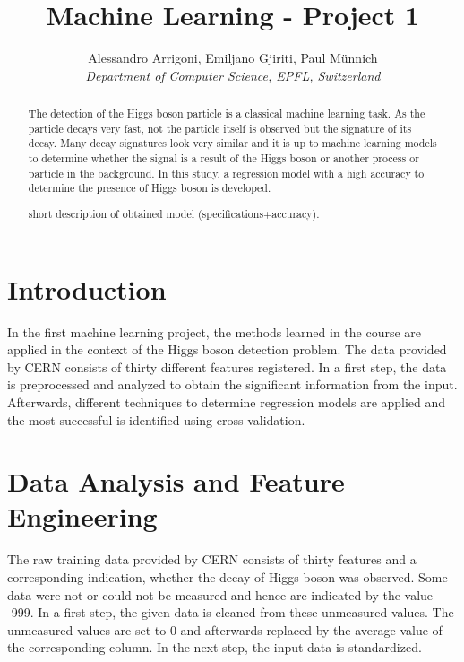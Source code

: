 \documentclass[10pt,conference,compsocconf]{IEEEtran}
\begin{document}
\title{Machine Learning - Project 1}

\author{
  Alessandro Arrigoni, Emiljano Gjiriti, Paul M\"unnich\\
  \textit{Department of Computer Science, EPFL, Switzerland}
}

\maketitle

\begin{abstract}
 The detection of the Higgs boson particle is a classical machine learning task. As the particle decays very fast, not the particle itself is observed but the signature of its decay. Many decay signatures look very similar and it is up to machine learning models to determine whether the signal is a result of the Higgs boson or another process or particle in the background. In this study, a regression model with a high accuracy to determine the presence of Higgs boson is developed. 
 
 short description of obtained model (specifications+accuracy).

\end{abstract}

\section{Introduction}

In the first machine learning project, the methods learned in the course are applied in the context of the Higgs boson detection problem.
The data provided by CERN consists of thirty different features registered. In a first step, the data is preprocessed and analyzed to obtain the significant information from the input.
Afterwards, different techniques to determine regression models are applied and the most successful is identified using cross validation. 

\section{Data Analysis and Feature Engineering}
\label{sec:Data Analysis}

The raw training data provided by CERN consists of thirty features and a corresponding indication, whether the decay of Higgs boson was observed. Some data were not or could not be measured and hence are indicated by the value -999. In a first step, the given data is cleaned from these unmeasured values. The unmeasured values are set to 0 and afterwards replaced by the average value of the corresponding column. In the next step, the input data is standardized. 
\end{document}
